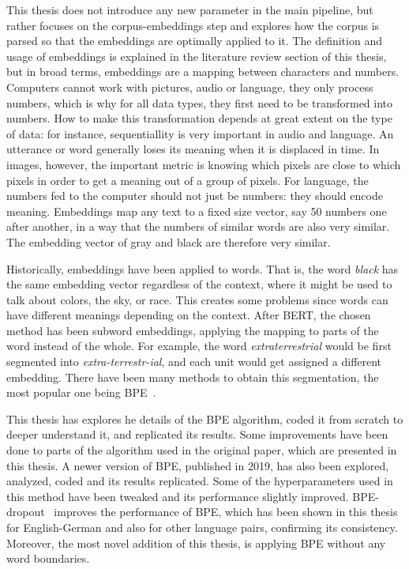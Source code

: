 This thesis does not introduce any new parameter in the main pipeline, but rather focuses on the corpus-embeddings step and explores how the corpus is parsed so that the embeddings are optimally applied to it. The definition and usage of embeddings is explained in the literature review section of this thesis, but in broad terms, embeddings are a mapping between characters and numbers. Computers cannot work with pictures, audio or language, they only process numbers, which is why for all data types, they first need to be transformed into numbers. How to make this transformation depends at great extent on the type of data: for instance, sequentiallity is very important in audio and language. An utterance or word generally loses its meaning when it is displaced in time. In images, however, the important metric is knowing which pixels are close to which pixels in order to get a meaning out of a group of pixels. For language, the numbers fed to the computer should not just be numbers: they should encode meaning. Embeddings map any text to a fixed size vector, say 50 numbers one after another, in a way that the numbers of similar words are also very similar. The embedding vector of gray and black are therefore very similar.

Historically, embeddings have been applied to words. That is, the word \emph{black} has the same embedding vector regardless of the context, where it might be used to talk about colors, the sky, or race. This creates some problems since words can have different meanings depending on the context. After BERT, the chosen method has been subword embeddings, applying the mapping to parts of the word instead of the whole. For example, the word \emph{extraterrestrial} would be first segmented into \emph{extra-terrestr-ial}, and each unit would get assigned a different embedding. There have been many methods to obtain this segmentation, the most popular one being BPE~\cite{sennrich2015neural}.

This thesis has explores he details of the BPE algorithm, coded it from scratch to deeper understand it, and replicated its results. Some improvements have been done to parts of the algorithm used in the original paper, which are presented in this thesis. A newer version of BPE, published in 2019, has also been explored, analyzed, coded and its results replicated. Some of the hyperparameters used in this method have been tweaked and its performance slightly improved. BPE-dropout~\cite{provilkov2019bpedropout} improves the performance of BPE, which has been shown in this thesis for English-German and also for other language pairs, confirming its consistency. Moreover, the most novel addition of this thesis, is applying BPE without any word boundaries.

